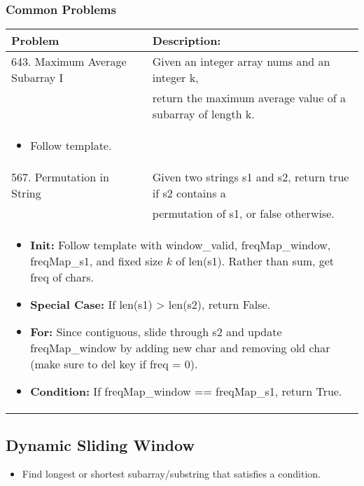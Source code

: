 \subsubsection{Common Problems}
\begin{summary}
    \begin{center}
        \begin{tabular}{ll}
            \toprule
            \textbf{Problem} & \textbf{Description:} \\
            \midrule
            643. Maximum Average Subarray I & Given an integer array nums and an integer k, \\
            & return the maximum average value of a subarray of length k. \\
            \multicolumn{2}{p{\linewidth}}{
                \begin{itemize}
                    \item Follow template. 
                \end{itemize}
            } \\
            \midrule
            567. Permutation in String & Given two strings s1 and s2, return true if s2 contains a \\
            & permutation of s1, or false otherwise. \\
            \multicolumn{2}{p{\linewidth}}{
                \begin{itemize}
                    \item \textbf{Init:} Follow template with window\_valid, freqMap\_window, freqMap\_s1, and fixed size $k$ of len(s1). Rather than sum, get freq of chars. 
                    \item \textbf{Special Case:} If len(s1) > len(s2), return False.
                    \item \textbf{For:} Since contiguous, slide through s2 and update freqMap\_window by adding new char and removing old char (make sure to del key if freq = 0).
                    \item \textbf{Condition:} If freqMap\_window == freqMap\_s1, return True.
                \end{itemize}
            } \\
            \bottomrule
        \end{tabular}
    \end{center}
\end{summary}
\newpage

\subsection{Dynamic Sliding Window}
\begin{summary}
    \begin{itemize}
        \item Find longest or shortest subarray/substring that satisfies a condition.
    \end{itemize}
\end{summary}

